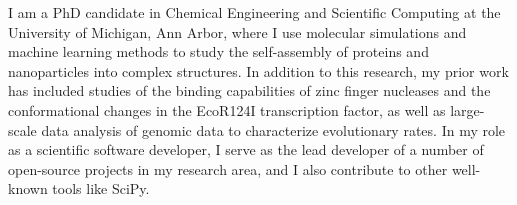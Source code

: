 \begin{cvparagraph}

I am a PhD candidate in Chemical Engineering and Scientific Computing at the University of Michigan, Ann Arbor, where I use molecular simulations and machine learning methods to study the self-assembly of proteins and nanoparticles into complex structures.
In addition to this research, my prior work has included studies of the binding capabilities of zinc finger nucleases and the conformational changes in the EcoR124I transcription factor, as well as large-scale data analysis of genomic data to characterize evolutionary rates.
In my role as a scientific software developer, I serve as the lead developer of a number of open-source projects in my research area, and I also contribute to other well-known tools like SciPy.
\end{cvparagraph}
